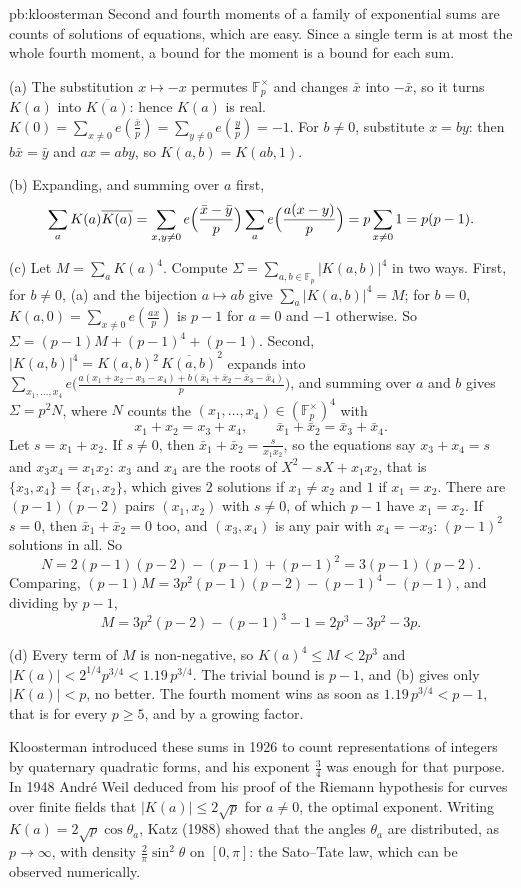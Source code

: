 \begin{solution}{pb:kloosterman}
\idea Second and fourth moments of a family of exponential sums are counts of solutions of equations, which are easy. Since a
single term is at most the whole fourth moment, a bound for the moment is a bound for each sum.

\writeup (a) The substitution $x\mapsto-x$ permutes $\mathbb F_p^\times$ and changes $\bar x$ into $-\bar x$, so it turns $K(a)$ into $\overline{K(a)}$: hence $K(a)$
is real. $K(0)=\sum_{x\ne0}e(\frac{\bar x}p)=\sum_{y\ne0}e(\frac yp)=-1$. For $b\ne0$, substitute $x=by$: then $b\bar x=\bar y$ and $ax=aby$, so $K(a,b)=K(ab,1)$.

(b) Expanding, and summing over $a$ first,
\[
\sum_aK(a)\overline{K(a)}=\sum_{x,y\ne0}e\Bigl(\frac{\bar x-\bar y}p\Bigr)\sum_ae\Bigl(\frac{a(x-y)}p\Bigr)=p\sum_{x\ne0}1=p(p-1).
\]

(c) Let $M=\sum_aK(a)^4$. Compute $\Sigma=\sum_{a,b\in\mathbb F_p}|K(a,b)|^4$ in two ways. First, for $b\ne0$, (a) and the bijection $a\mapsto ab$ give
$\sum_a|K(a,b)|^4=M$; for $b=0$, $K(a,0)=\sum_{x\ne0}e(\frac{ax}p)$ is $p-1$ for $a=0$ and $-1$ otherwise. So
$\Sigma=(p-1)M+(p-1)^4+(p-1)$. Second, $|K(a,b)|^4=K(a,b)^2\,\overline{K(a,b)}^2$ expands into
$\sum_{x_1,\dots,x_4}e\bigl(\frac{a(x_1+x_2-x_3-x_4)+b(\bar x_1+\bar x_2-\bar x_3-\bar x_4)}p\bigr)$, and summing over $a$ and $b$ gives $\Sigma=p^2N$, where $N$ counts the
$(x_1,\dots,x_4)\in(\mathbb F_p^\times)^4$ with
\[
x_1+x_2=x_3+x_4,\qquad\bar x_1+\bar x_2=\bar x_3+\bar x_4.
\]
Let $s=x_1+x_2$. If $s\ne0$, then $\bar x_1+\bar x_2=\frac s{x_1x_2}$, so the equations say $x_3+x_4=s$ and $x_3x_4=x_1x_2$: $x_3$ and $x_4$ are the
roots of $X^2-sX+x_1x_2$, that is $\{x_3,x_4\}=\{x_1,x_2\}$, which gives $2$ solutions if $x_1\ne x_2$ and $1$ if $x_1=x_2$. There are $(p-1)(p-2)$
pairs $(x_1,x_2)$ with $s\ne0$, of which $p-1$ have $x_1=x_2$. If $s=0$, then $\bar x_1+\bar x_2=0$ too, and $(x_3,x_4)$ is any pair with
$x_4=-x_3$: $(p-1)^2$ solutions in all. So
\[
N=2(p-1)(p-2)-(p-1)+(p-1)^2=3(p-1)(p-2).
\]
Comparing, $(p-1)M=3p^2(p-1)(p-2)-(p-1)^4-(p-1)$, and dividing by $p-1$,
\[
M=3p^2(p-2)-(p-1)^3-1=2p^3-3p^2-3p.
\]

(d) Every term of $M$ is non-negative, so $K(a)^4\le M<2p^3$ and $|K(a)|<2^{1/4}p^{3/4}<1.19\,p^{3/4}$. The trivial bound is $p-1$, and (b) gives
only $|K(a)|<p$, no better. The fourth moment wins as soon as $1.19\,p^{3/4}<p-1$, that is for every $p\ge5$, and by a growing factor.

\leads Kloosterman introduced these sums in 1926 to count representations of integers by quaternary quadratic forms, and his
exponent $\frac34$ was enough for that purpose. In 1948 André Weil deduced from his proof of the Riemann hypothesis for curves over
finite fields that $|K(a)|\le2\sqrt p$ for $a\ne0$, the optimal exponent. Writing $K(a)=2\sqrt p\cos\theta_a$, Katz
(1988) showed that the angles $\theta_a$ are distributed, as $p\to\infty$, with density $\frac2\pi\sin^2\theta$ on $[0,\pi]$: the Sato--Tate law,
which can be observed numerically.
\end{solution}

